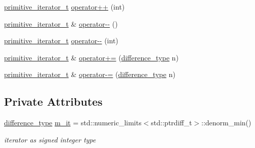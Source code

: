 \begin{DoxyCompactItemize}
\item 
\hyperlink{classnlohmann_1_1basic__json_1_1primitive__iterator__t}{primitive\+\_\+iterator\+\_\+t} \hyperlink{classnlohmann_1_1basic__json_1_1primitive__iterator__t_a6037e167f0306a815ae6b53b290c39a7}{operator++} (int)
\item 
\hyperlink{classnlohmann_1_1basic__json_1_1primitive__iterator__t}{primitive\+\_\+iterator\+\_\+t} \& \hyperlink{classnlohmann_1_1basic__json_1_1primitive__iterator__t_a914f3b7b83db7fc4208afd9dd4f216fb}{operator-\/-\/} ()
\item 
\hyperlink{classnlohmann_1_1basic__json_1_1primitive__iterator__t}{primitive\+\_\+iterator\+\_\+t} \hyperlink{classnlohmann_1_1basic__json_1_1primitive__iterator__t_a93f7ba811fe77cc070aff46e0dabffb3}{operator-\/-\/} (int)
\item 
\hyperlink{classnlohmann_1_1basic__json_1_1primitive__iterator__t}{primitive\+\_\+iterator\+\_\+t} \& \hyperlink{classnlohmann_1_1basic__json_1_1primitive__iterator__t_a1bcc58a5506cd8a4ee864f59c2ea4942}{operator+=} (\hyperlink{classnlohmann_1_1basic__json_afe7c1303357e19cea9527af4e9a31d8f}{difference\+\_\+type} n)
\item 
\hyperlink{classnlohmann_1_1basic__json_1_1primitive__iterator__t}{primitive\+\_\+iterator\+\_\+t} \& \hyperlink{classnlohmann_1_1basic__json_1_1primitive__iterator__t_a602e4a8601791b3a436db37cc2531c22}{operator-\/=} (\hyperlink{classnlohmann_1_1basic__json_afe7c1303357e19cea9527af4e9a31d8f}{difference\+\_\+type} n)
\end{DoxyCompactItemize}
\subsection*{Private Attributes}
\begin{DoxyCompactItemize}
\item 
\hyperlink{classnlohmann_1_1basic__json_afe7c1303357e19cea9527af4e9a31d8f}{difference\+\_\+type} \hyperlink{classnlohmann_1_1basic__json_1_1primitive__iterator__t_abe60fb63dd56044712ece9d9826a4af6}{m\+\_\+it} = std\+::numeric\+\_\+limits$<$std\+::ptrdiff\+\_\+t$>$\+::denorm\+\_\+min()
\begin{DoxyCompactList}\small\item\em iterator as signed integer type \end{DoxyCompactList}\end{DoxyCompactItemize}
